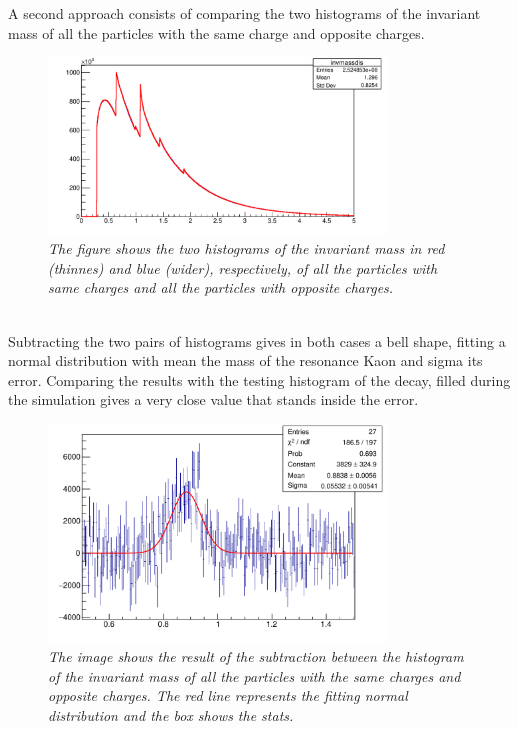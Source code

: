 \documentclass[a4paper, 11pt]{article}
\begin{document}
    A second approach consists of comparing the two histograms of the invariant mass of all the particles with the same charge and opposite charges.
    \\
    \begin{figure}[h!]
      \includegraphics[width=9cm]{c3.pdf}
      \caption{\label{f4} \textit{The figure shows the two histograms of the invariant mass in red (thinnes) and blue (wider), respectively, of all the particles with same charges and all the particles with opposite charges.}}
    \end{figure}\\
    Subtracting the two pairs of histograms gives in both cases a bell shape, fitting a normal distribution with mean the mass of the resonance Kaon and sigma its error. Comparing the results with the testing histogram of the decay, filled during the simulation gives a very close value that stands inside the error.
    \\
    \begin{figure}[h!]
      \includegraphics[width=9cm]{c6.pdf}
      \caption{\label{f5} \textit{The image shows the result of the subtraction between the histogram of the invariant mass of all the particles with the same charges and opposite charges. The red line represents the fitting normal distribution and the box shows the stats.}}
    \end{figure}
    \\
    \\
\end{document}
